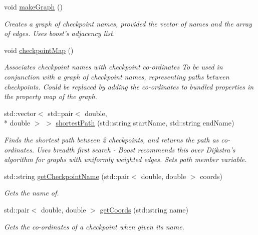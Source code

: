 \begin{DoxyCompactItemize}
\item 
\hypertarget{classCheckPointGraph_a417bcd9db81360b38575569f3900b0c0}{void \hyperlink{classCheckPointGraph_a417bcd9db81360b38575569f3900b0c0}{make\-Graph} ()}\label{classCheckPointGraph_a417bcd9db81360b38575569f3900b0c0}

\begin{DoxyCompactList}\small\item\em Creates a graph of checkpoint names, provided the vector of names and the array of edges. Uses boost's adjacency list. \end{DoxyCompactList}\item 
\hypertarget{classCheckPointGraph_a07e2e7cf2afa95d82076f87600761728}{void \hyperlink{classCheckPointGraph_a07e2e7cf2afa95d82076f87600761728}{checkpoint\-Map} ()}\label{classCheckPointGraph_a07e2e7cf2afa95d82076f87600761728}

\begin{DoxyCompactList}\small\item\em Associates checkpoint names with checkpoint co-\/ordinates To be used in conjunction with a graph of checkpoint names, representing paths between checkpoints. Could be replaced by adding the co-\/ordinates to bundled properties in the property map of the graph. \end{DoxyCompactList}\item 
std\-::vector$<$ std\-::pair$<$ double, \\*
double $>$ $>$ \hyperlink{classCheckPointGraph_ab48dfe7feccab1d732901b83a0ec4612}{shortest\-Path} (std\-::string start\-Name, std\-::string end\-Name)
\begin{DoxyCompactList}\small\item\em Finds the shortest path between 2 checkpoints, and returns the path as co-\/ordinates. Uses breadth first search -\/ Boost recommends this over Dijkstra's algorithm for graphs with uniformly weighted edges. Sets path member variable. \end{DoxyCompactList}\item 
\hypertarget{classCheckPointGraph_a92da1b78dfbf86627397265c43143100}{std\-::string \hyperlink{classCheckPointGraph_a92da1b78dfbf86627397265c43143100}{get\-Checkpoint\-Name} (std\-::pair$<$ double, double $>$ coords)}\label{classCheckPointGraph_a92da1b78dfbf86627397265c43143100}

\begin{DoxyCompactList}\small\item\em Gets the name of. \end{DoxyCompactList}\item 
std\-::pair$<$ double, double $>$ \hyperlink{classCheckPointGraph_a2200216c4d24426b2b479b3a8bb7141d}{get\-Coords} (std\-::string name)
\begin{DoxyCompactList}\small\item\em Gets the co-\/ordinates of a checkpoint when given its name. \end{DoxyCompactList}\end{DoxyCompactItemize}


